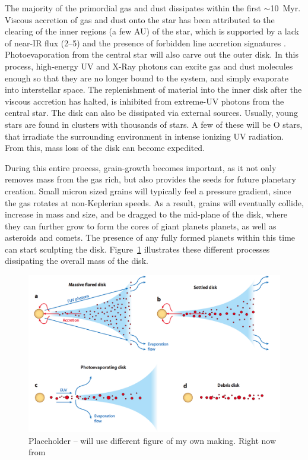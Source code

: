     The majority of the primordial gas and dust dissipates within the first $\sim$10~Myr. Viscous accretion of gas and dust onto the star has been attributed to the clearing of the inner regions (a few AU) of the star, which is supported by a lack of near-IR flux (2--5\micron) and the presence of forbidden line accretion signatures \citep[e.g., O~I, S~II][]{Hartigan1995}. Photoevaporation from the central star will also carve out the outer disk. In this process, high-energy UV and X-Ray photons can excite gas and dust molecules enough so that they are no longer bound to the system, and simply evaporate into interstellar space. The replenishment of material into the inner disk after the viscous accretion has halted, is inhibited from extreme-UV photons from the central star. The disk can also be dissipated via external sources. Usually, young stars are found in clusters with thousands of stars. A few of these will be O stars, that irradiate the surrounding environment in intense ionizing UV radiation. From this, mass loss of the disk can become expedited. 
    
    During this entire process, grain-growth becomes important, as it not only removes mass from the gas rich, but also provides the seeds for future planetary creation. Small micron sized grains will typically feel a pressure gradient, since the gas rotates at non-Keplerian speeds. As a result, grains will eventually collide, increase in mass and size, and be dragged to the mid-plane of the disk, where they can further grow to form the cores of giant planets planets, as well as asteroids and comets. The presence of any fully formed planets within this time can start sculpting the disk. Figure~\ref{fig:ppd_2_dd} illustrates these different processes dissipating the overall mass of the disk.
    
    \begin{figure}
    \centering
    \includegraphics[width=\textwidth]{Ch1/disk_evolution_wc2011} 
    \caption[Disk Evolution Mechanisms]{Placeholder -- will use different figure of my own making. Right now from \citep{Williams2011}}
    \label{fig:ppd_2_dd}
    \end{figure}
    
